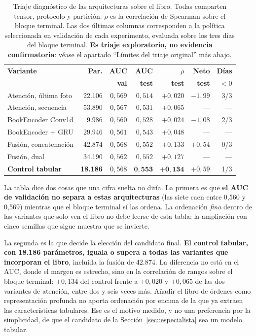 \begin{table}[htbp]
\centering
\caption[Triaje diagnóstico de las arquitecturas profundas]{Triaje diagnóstico de las
arquitecturas sobre el libro. Todas comparten tensor, protocolo y partición. $\rho$ es la
correlación de Spearman sobre el bloque terminal. Las dos últimas columnas corresponden a
la política seleccionada en validación de cada experimento, evaluada sobre los tres días
del bloque terminal. \textbf{Es triaje exploratorio, no evidencia confirmatoria}: véase el apartado
``Límites del triaje original'' más abajo.}
\label{tab:triaje_profundo}
\footnotesize
\setlength{\tabcolsep}{4.5pt}
\begin{tabular}{lrrrrrr}
\toprule
\textbf{Variante} & \textbf{Par.} & \textbf{AUC} & \textbf{AUC} & \textbf{$\rho$} & \textbf{Neto} & \textbf{Días} \\
 & & \textbf{val} & \textbf{test} & \textbf{test} & \textbf{test} & \textbf{$<0$} \\
\midrule
Atención, última foto & 22.106 & $0{,}569$ & $0{,}514$ & $+0{,}020$ & $-1{,}99$ & 3/3 \\
Atención, secuencia       & 53.890 & $0{,}567$ & $0{,}531$ & $+0{,}065$ & --- & --- \\
\addlinespace
BookEncoder Conv1d         &  9.986 & $0{,}560$ & $0{,}528$ & $+0{,}024$ & $-1{,}08$ & 2/3 \\
BookEncoder + GRU         & 29.946 & $0{,}561$ & $0{,}543$ & $+0{,}048$ & --- & --- \\
\addlinespace
Fusión, concatenación      & 42.874 & $0{,}568$ & $0{,}552$ & $+0{,}133$ & $+0{,}54$ & 0/3 \\
Fusión, dual               & 34.190 & $0{,}562$ & $0{,}552$ & $+0{,}127$ & --- & --- \\
\addlinespace
\textbf{Control tabular}   & \textbf{18.186} & $0{,}568$ & $\mathbf{0{,}553}$ & $\mathbf{+0{,}134}$ & $+0{,}59$ & 1/3 \\
\bottomrule
\end{tabular}
\end{table}

La tabla dice dos cosas que una cifra suelta no diría. La primera es que \textbf{el AUC de
validación no separa a estas arquitecturas} (las siete caen entre 0,560 y 0,569) mientras
que el bloque terminal sí las ordena. La ordenación \emph{fina} dentro de las variantes que
solo ven el libro no debe leerse de esta tabla: la ampliación con cinco semillas que sigue
muestra que se invierte.

La segunda es la que decide la elección del candidato final. \textbf{El control tabular,
con 18.186 parámetros, iguala o supera a todas las variantes que incorporan el libro},
incluida la fusión de 42.874. La diferencia no está en el AUC, donde el margen es estrecho,
sino en la correlación de rangos sobre el bloque terminal: $+0{,}134$ del control frente a
$+0{,}020$ y $+0{,}065$ de las dos variantes de atención, entre dos y seis veces más. Añadir
el libro de órdenes como representación profunda no aporta ordenación por encima de la que
ya extraen las características tabulares. Ese es el motivo medido, y no una preferencia por
la simplicidad, de que el candidato de la Sección~\ref{sec::especialista} sea un modelo
tabular.

